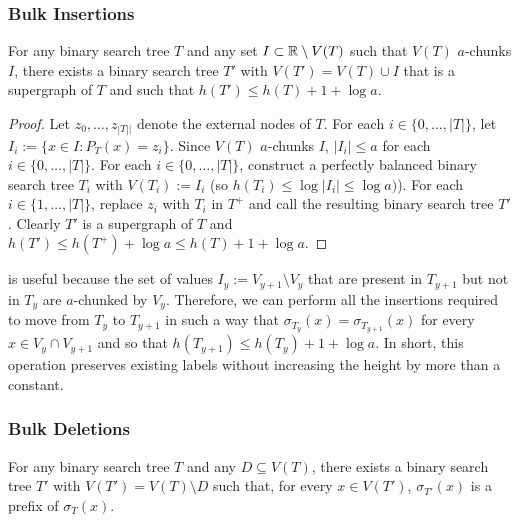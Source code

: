 \documentclass[kpfonts]{patmorin}
\begin{document}
\subsubsection{Bulk Insertions}

\begin{lem}
  For any binary search tree $T$ and any set $I\subset\mathbb{R}\setminus V(T)$ such that $V(T)$ $a$-chunks $I$, there exists a binary search tree $T'$ with $V(T')=V(T)\cup I$ that is a supergraph of $T$ and such that $h(T')\le h(T)+1+\log a$.
\end{lem}

\begin{proof}
  Let $z_0,\ldots,z_{|T||}$ denote the external nodes of $T$.  For each $i\in\{0,\ldots,|T|\}$, let $I_i:=\{x\in I: P_T(x)=z_i\}$.
  Since $V(T)$ $a$-chunks $I$, $|I_i|\le a$ for each $i\in\{0,\ldots,|T|\}$. For each $i\in\{0,\ldots,|T|\}$, construct a perfectly balanced binary search tree $T_i$ with $V(T_i):=I_i$ (so $h(T_i)\le\log|I_i|\le\log a)$). For each $i\in\{1,\ldots,|T|\}$, replace $z_i$ with $T_i$ in $T^+$ and call the resulting binary search tree $T'$.  Clearly $T'$ is a supergraph of $T$ and $h(T')\le h(T^+)+\log a\le h(T)+1+\log a$.
\end{proof}

 is useful because the set of values $I_y:=V_{y+1}\setminus V_y$ that are present in $T_{y+1}$ but not in $T_y$ are $a$-chunked by $V_y$. Therefore, we can perform all the insertions required to move from $T_y$ to $T_{y+1}$ in such a way that $\sigma_{T_y}(x)=\sigma_{T_{y+1}}(x)$ for every $x\in V_y\cap V_{y+1}$ and so that $h(T_{y+1})\le h(T_y)+1+\log a$.  In short, this operation preserves existing labels without increasing the height by more than a constant.

\subsubsection{Bulk Deletions}

\begin{lem}
  For any binary search tree $T$ and any $D\subseteq V(T)$, there exists a binary search tree $T'$ with $V(T')=V(T)\setminus D$ such that, for every $x\in V(T')$, $\sigma_{T'}(x)$ is a prefix of $\sigma_{T}(x)$.
\end{lem}
\end{document}
